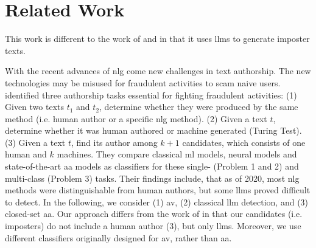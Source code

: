 \chapter{Related Work}
\label{chap:related_work}

This work is different to the work of \cite{koppel_determining_2014} and \cite{kocher_unine_2015} 
in that it uses \acp{llm} to generate imposter texts.


With the recent advances of \ac{nlg} come new challenges in text authorship.
The new technologies may be misused for fraudulent activities to scam naive users.
\citet{uchendu_authorship_2020} identified three authorship tasks essential for fighting fraudulent activities:
(1) Given two texts $t_1$ and $t_2$, determine whether they were produced by the same method (i.e. human author or a specific \ac{nlg} method).
(2) Given a text $t$, determine whether it was human authored or machine generated (Turing Test).
(3) Given a text $t$, find its author among $k+1$ candidates, which consists of one human and $k$ machines.
They compare classical \ac{ml} models, neural models and state-of-the-art \ac{aa} models as classifiers 
for these single- (Problem 1 and 2) and multi-class (Problem 3) tasks.
Their findings include, that as of 2020, most \ac{nlg} methods were distinguishable from human authors, 
but some \acp{llm} proved difficult to detect.
In the following, we consider (1) \ac{av}, (2) classical \ac{llm} detection, and (3) closed-set \ac{aa}.
Our approach differs from the work of \citet{uchendu_authorship_2020} in that our candidates (i.e. imposters) do not include a human author (3), 
but only \acp{llm}.
Moreover, we use different classifiers originally designed for \ac{av}, rather than \ac{aa}.